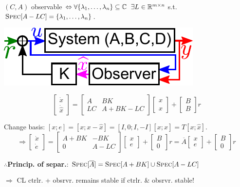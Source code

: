 \begin{Theorem}
$(C,A)$ observable $\Leftrightarrow\forall\{\lambda_1,\ldots,\lambda_n\}\subseteq\mathbb C$ $\exists L\in\mathbb R^{m\times n}$ s.t. $\textsc{Spec}[A-LC]=\{\lambda_1,\ldots,\lambda_n\}$.
\end{Theorem}





\begin{minipage}{0.3\columnwidth}
\includegraphics[height=0.33\columnwidth]{figures/separation.pdf}
\end{minipage}%
\begin{minipage}{0.7\columnwidth}
\begin{equation*}
\begin{bmatrix}
\dot x \\
\dot{\widehat x}
\end{bmatrix}=\begin{bmatrix}
A & BK \\
LC & A+BK-LC
\end{bmatrix}\begin{bmatrix}
x \\
\widehat x
\end{bmatrix}+\begin{bmatrix}
B \\
B
\end{bmatrix}r
\end{equation*}
\end{minipage}
Change basis: $[x;e]=[x;x-\widehat x]=[I,0;I,-I][x;\widehat x]=T[x;\widehat x]$.
\begin{equation*}
\Rightarrow \begin{bmatrix}
\dot x \\
\dot e
\end{bmatrix}=\begin{bmatrix}
A+BK & -BK \\
0 & A-LC
\end{bmatrix}\begin{bmatrix}
x \\ e
\end{bmatrix}+\begin{bmatrix}
B \\ 0
\end{bmatrix}r=\overline A\begin{bmatrix}
x \\ e
\end{bmatrix}+\begin{bmatrix}
B \\ 0
\end{bmatrix}r
\end{equation*}
\begin{Theorem}
$\therefore$\textbf{Princip. of separ.}: $\textsc{Spec}[\overline A]=\textsc{Spec}[A+BK]\cup\textsc{Spec}[A-LC]$

$\Rightarrow$ CL ctrlr. + obsrvr. remains stable if ctrlr. \& obsrvr. stable!
\end{Theorem}